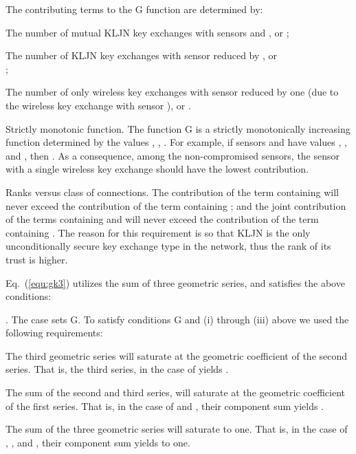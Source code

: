 \documentclass{ws-fnl2}
\begin{document}
\begin{romanlist}[(ii)]
 \item The contributing terms to the G function are determined by:
 \begin{romanlist}[(b)]
  \item The number  of mutual KLJN key exchanges with sensors  and , or ;
  \item The number  of KLJN key exchanges with sensor  reduced by ,  or \\ ;
  \item The number  of only wireless key exchanges with sensor  reduced by one (due to the wireless key exchange with sensor ), or .
 \end{romanlist}
 \item Strictly monotonic function. The function G is a strictly monotonically increasing function determined by the values , , . For example, if sensors  and  have values , , and , then . As a consequence, among the non-compromised sensors, the sensor with a single wireless key exchange should have the lowest contribution.
 
 \item Ranks versus class of connections. The contribution of the term containing  will never exceed the contribution of the term containing ; and the joint contribution of the terms containing  and  will never exceed the contribution of the term containing . The reason for this requirement is so that KLJN is the only unconditionally secure key exchange type in the network, thus the rank of its trust is higher. 
\end{romanlist}


Eq.~(\ref{equ:gk3}) utilizes the sum of three geometric series, and satisfies the above conditions:



\noindent
. The case  sets G. To satisfy conditions G and (i) through (iii) above we used the following requirements:

\begin{romanlist}[(ii)]
 \item The third geometric series will saturate at the geometric coefficient of the second series. That is, the third series, in the case of  yields .
 
 \item The sum of the second and third series, will saturate at the geometric coefficient of the first series. That is, in the case of  and , their component sum yields . 
 
 \item The sum of the three geometric series will saturate to one. That is, in the case of , , and , their component sum yields to one. 
\end{romanlist}
\end{document}
